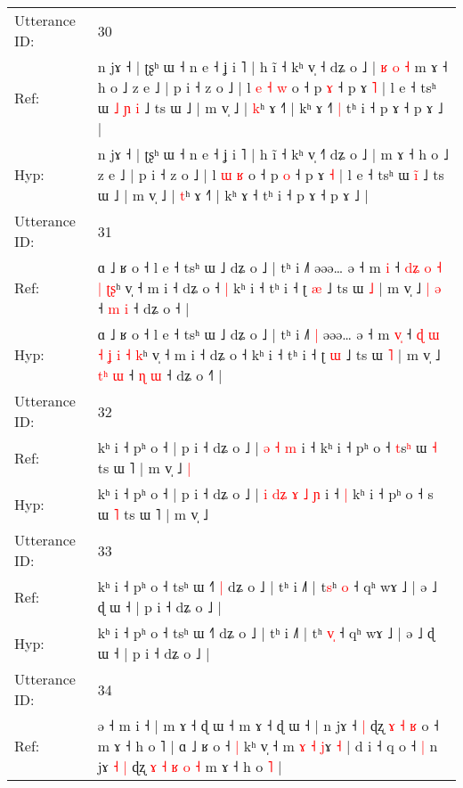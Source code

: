 \documentclass[10pt]{article}
\DeclareRobustCommand{\hl}[1]{{\textcolor{red}{#1}}}
\begin{document}
\begin{longtable}{ll}
 \\
\midrule
Utterance ID: & 30 \\
Ref: & n jɤ ˧ | ʈʂʰ ɯ ˧ n e ˧ ʝ i ˥ | h ĩ ˧ kʰ v̩ ˧\hl{} dʑ o ˩ |\hl{ }\hl{ʁ}\hl{ }\hl{o}\hl{ }\hl{˧} m ɤ ˧ h o ˩ z e ˩ | p i ˧ z o ˩ | l\hl{ }\hl{e} \hl{˧} \hl{w} o ˧ p \hl{ɤ} ˧ p ɤ \hl{˥} | l e ˧ tsʰ ɯ\hl{ }\hl{˩} \hl{ɲ}\hl{ }\hl{i} ˩ ts ɯ ˩ | m v̩ ˩ | \hl{k}ʰ ɤ ˧˥ | kʰ ɤ ˧\hl{˥}\hl{ }\hl{|} tʰ i ˧ p ɤ ˧ p ɤ ˩ |
 \\
Hyp: & n jɤ ˧ | ʈʂʰ ɯ ˧ n e ˧ ʝ i ˥ | h ĩ ˧ kʰ v̩ ˧\hl{˥} dʑ o ˩ |\hl{}\hl{}\hl{}\hl{}\hl{}\hl{} m ɤ ˧ h o ˩ z e ˩ | p i ˧ z o ˩ | l\hl{}\hl{} \hl{ɯ} \hl{ʁ} o ˧ p \hl{o} ˧ p ɤ \hl{˧} | l e ˧ tsʰ ɯ\hl{}\hl{} \hl{}\hl{i}\hl{̃} ˩ ts ɯ ˩ | m v̩ ˩ | \hl{t}ʰ ɤ ˧˥ | kʰ ɤ ˧\hl{}\hl{}\hl{} tʰ i ˧ p ɤ ˧ p ɤ ˩ |
 \\
\midrule
Utterance ID: & 31 \\
Ref: & ɑ ˩ ʁ o ˧ l e ˧ tsʰ ɯ ˩ dʑ o ˩ | tʰ i ˩˥\hl{}\hl{} əəə… ə ˧ m \hl{}\hl{i} ˧ \hl{}\hl{d}\hl{ʑ} \hl{o} \hl{˧} \hl{|} \hl{}\hl{ʈ}\hl{ʂ}ʰ v̩ ˧ m i ˧ dʑ o ˧\hl{ }\hl{|} kʰ i ˧ tʰ i ˧ ʈ \hl{æ} ˩ ts ɯ \hl{˩} | m v̩ ˩ \hl{}\hl{|} \hl{ə} ˧ \hl{m} \hl{i} ˧ dʑ o ˧\hl{} |
 \\
Hyp: & ɑ ˩ ʁ o ˧ l e ˧ tsʰ ɯ ˩ dʑ o ˩ | tʰ i ˩˥\hl{ }\hl{|} əəə… ə ˧ m \hl{v}\hl{̩} ˧ \hl{ɖ}\hl{ }\hl{ɯ} \hl{˧} \hl{ʝ} \hl{i} \hl{˧}\hl{ }\hl{k}ʰ v̩ ˧ m i ˧ dʑ o ˧\hl{}\hl{} kʰ i ˧ tʰ i ˧ ʈ \hl{ɯ} ˩ ts ɯ \hl{˥} | m v̩ ˩ \hl{t}\hl{ʰ} \hl{ɯ} ˧ \hl{ɳ} \hl{ɯ} ˧ dʑ o ˧\hl{˥} |
 \\
\midrule
Utterance ID: & 32 \\
Ref: & kʰ i ˧ pʰ o ˧ | p i ˧ dʑ o ˩ |\hl{}\hl{}\hl{}\hl{}\hl{} \hl{ə} \hl{˧} \hl{m} i ˧\hl{}\hl{} kʰ i ˧ pʰ o ˧ \hl{t}s\hl{ʰ} ɯ \hl{˧} ts ɯ ˥ | m v̩ ˩\hl{ }\hl{|}
 \\
Hyp: & kʰ i ˧ pʰ o ˧ | p i ˧ dʑ o ˩ |\hl{ }\hl{i}\hl{ }\hl{d}\hl{ʑ} \hl{ɤ} \hl{˩} \hl{ɲ} i ˧\hl{ }\hl{|} kʰ i ˧ pʰ o ˧ \hl{}s\hl{} ɯ \hl{˥} ts ɯ ˥ | m v̩ ˩\hl{}\hl{}
 \\
\midrule
Utterance ID: & 33 \\
Ref: & kʰ i ˧ pʰ o ˧ tsʰ ɯ ˧˥\hl{ }\hl{|} dʑ o ˩ | tʰ i ˩˥ | t\hl{s}ʰ \hl{}\hl{o} ˧ qʰ wɤ ˩ | ə ˩ ɖ ɯ ˧ | p i ˧ dʑ o ˩ |
 \\
Hyp: & kʰ i ˧ pʰ o ˧ tsʰ ɯ ˧˥\hl{}\hl{} dʑ o ˩ | tʰ i ˩˥ | t\hl{}ʰ \hl{v}\hl{̩} ˧ qʰ wɤ ˩ | ə ˩ ɖ ɯ ˧ | p i ˧ dʑ o ˩ |
 \\
\midrule
Utterance ID: & 34 \\
Ref: & ə ˧ m i ˧ | m ɤ ˧ ɖ ɯ ˧ m ɤ ˧ ɖ ɯ ˧ | n jɤ ˧\hl{ }\hl{|} ɖʐ\hl{ }\hl{ɤ}\hl{ }\hl{˧}\hl{ }\hl{ʁ} o ˧ m ɤ ˧ h o \hl{}˥ | ɑ ˩ ʁ o ˧\hl{ }\hl{|} kʰ v̩ ˧ m\hl{ }\hl{ɤ}\hl{ }\hl{˧} \hl{j}ɤ \hl{˧} | d i ˧ q o ˧\hl{ }\hl{|} n jɤ\hl{ }\hl{˧} \hl{|} ɖʐ\hl{ }\hl{ɤ}\hl{ }\hl{˧} \hl{ʁ} \hl{o} \hl{˧} m ɤ ˧ h o \hl{˥} |

\end{longtable}
\end{document}
